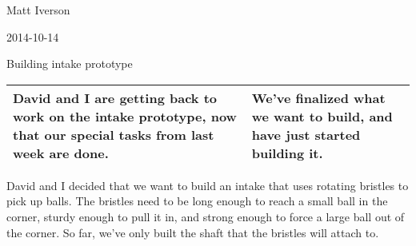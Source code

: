 Matt Iverson

2014-10-14

Building intake prototype

\begin{tabular}{|p{5cm}|p{5cm}|}
 \hline
 David and I are getting back to work on the intake prototype, now that our special tasks from last week are done. &
 We’ve finalized what we want to build, and have just started building it. \\
 \hline
\end{tabular}

David and I decided that we want to build an intake that uses rotating bristles to pick up balls. The bristles need to be long enough to reach a small ball in the corner, sturdy enough to pull it in, and strong enough to force a large ball out of the corner. So far, we’ve only built the shaft that the bristles will attach to.

